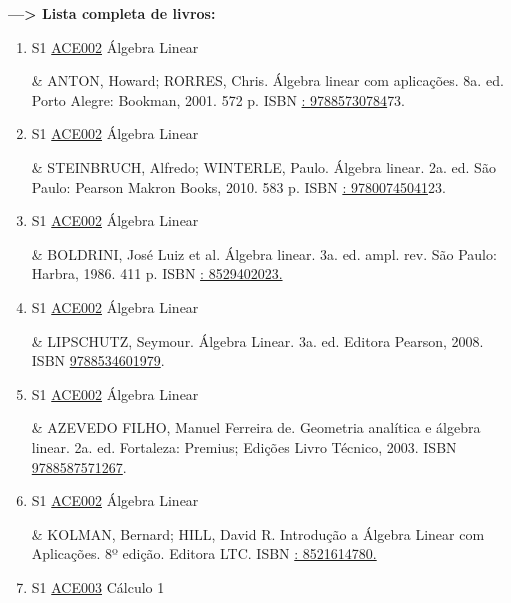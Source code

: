 \documentclass[12pt,a4paper]{book}
\begin{document}
 \textbf{---> Lista completa de livros:}\label{LISTACOMPLETA}
\begin{enumerate}
 \item S1 \hyperref[PUD:ACE002]{ACE002} Álgebra Linear

&  ANTON, Howard;  RORRES, Chris.  Álgebra linear com aplicações.  8a.  ed.  Porto Alegre: Bookman, 2001.  572 p.  ISBN \href{http://www.google.com/search?hl=pt-BR&tbo=p&tbm=bks&q=isbn:: 97885730784&num=10}{: 97885730784}73. 
 

 \item S1 \hyperref[PUD:ACE002]{ACE002} Álgebra Linear

&  STEINBRUCH, Alfredo;  WINTERLE, Paulo.  Álgebra linear.  2a.  ed.  São Paulo: Pearson Makron Books, 2010.  583 p.  ISBN \href{http://www.google.com/search?hl=pt-BR&tbo=p&tbm=bks&q=isbn:: 97800745041&num=10}{: 97800745041}23. 
 

 \item S1 \hyperref[PUD:ACE002]{ACE002} Álgebra Linear

&  BOLDRINI, José Luiz et al.  Álgebra linear.  3a.  ed.  ampl.  rev.  São Paulo: Harbra, 1986.  411 p.  ISBN \href{http://www.google.com/search?hl=pt-BR&tbo=p&tbm=bks&q=isbn:: 8529402023.&num=10}{: 8529402023.}
 \item S1 \hyperref[PUD:ACE002]{ACE002} Álgebra Linear

&   LIPSCHUTZ, Seymour.  Álgebra Linear.  3a.  ed.  Editora Pearson, 2008.  ISBN \href{http://www.bn.br/site/pages/servicosProfissionais/agenciaISBN/isbnBusca/FbnBuscaISBNCatalogo.asp?pField=ISBN&pIntPagina=1&pISBN=34601979&nidbISBN=true&hidbISBN=true}{9788534601979}. 
 

 \item S1 \hyperref[PUD:ACE002]{ACE002} Álgebra Linear

&   AZEVEDO FILHO, Manuel Ferreira de.  Geometria analítica e álgebra linear.  2a.  ed.  Fortaleza: Premius;  Edições Livro Técnico, 2003.  ISBN \href{http://www.bn.br/site/pages/servicosProfissionais/agenciaISBN/isbnBusca/FbnBuscaISBNCatalogo.asp?pField=ISBN&pIntPagina=1&pISBN=87571267&nidbISBN=true&hidbISBN=true}{9788587571267}. 
 

 \item S1 \hyperref[PUD:ACE002]{ACE002} Álgebra Linear

&   KOLMAN, Bernard;  HILL, David R.  Introdução a Álgebra Linear com Aplicações.  8º edição.  Editora LTC.  ISBN \href{http://www.google.com/search?hl=pt-BR&tbo=p&tbm=bks&q=isbn:: 8521614780.&num=10}{: 8521614780.}
 \item S1 \hyperref[PUD:ACE003]{ACE003} Cálculo 1


\end{enumerate}
\end{document}
